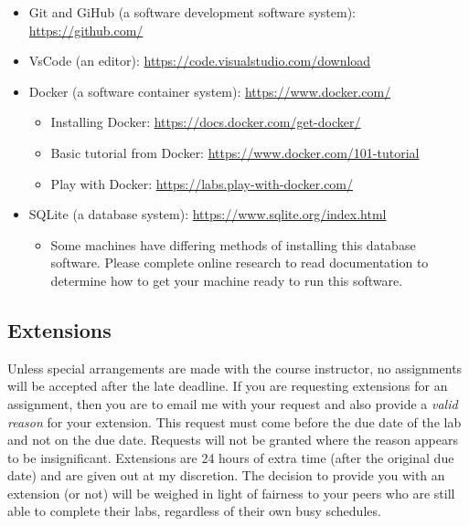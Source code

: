 \documentclass[11pt]{article} %
\begin{document}
\begin{itemize}
\item Git and GiHub (a software development software system): \url{https://github.com/}
\item VsCode (an editor): \url{https://code.visualstudio.com/download}
\item Docker (a software container system): \url{https://www.docker.com/}
	\begin{itemize}
		\item Installing Docker: \url{https://docs.docker.com/get-docker/}
		\item Basic tutorial from Docker: \url{https://www.docker.com/101-tutorial}
		\item Play with Docker: \url{https://labs.play-with-docker.com/}
	\end{itemize}
	\item SQLite (a database system): \url{https://www.sqlite.org/index.html}
	\begin{itemize}
		\item Some machines have differing methods of installing this database software. Please complete online research to read documentation to determine how to get your machine ready to run this software. 
	\end{itemize}
\end{itemize}











\vspace{-.10in}
\subsection*{\textbf{Extensions}}
Unless special arrangements are made with the course instructor, no assignments will be accepted after the late deadline. If you are requesting extensions for an assignment, then you are to email me with your request and also provide a \emph{valid reason} for your extension. This request must come before the due date of the lab and not on the due date. Requests will not be granted where the reason appears to be insignificant. Extensions are 24 hours of extra time (after the original due date) and are given out at my discretion. The decision to provide you with an extension (or not) will be weighed in light of fairness to your peers who are still able to complete their labs, regardless of their own busy schedules. 
\end{document}
